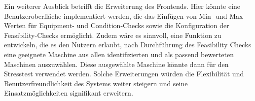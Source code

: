 Ein weiterer Ausblick betrifft die Erweiterung des Frontends. Hier könnte eine Benutzeroberfläche implementiert werden, die das Einfügen von Min- und Max-Werten für Equipment- und Condition-Checks sowie die Konfiguration der Feasibility-Checks ermöglicht. Zudem wäre es sinnvoll, eine Funktion zu entwickeln, die es den Nutzern erlaubt, nach Durchführung des Feasibility Checks eine geeignete Maschine aus allen identifizierten und als passend bewerteten Maschinen auszuwählen. Diese ausgewählte Maschine könnte dann für den Stresstest verwendet werden. Solche Erweiterungen würden die Flexibilität und Benutzerfreundlichkeit des Systems weiter steigern und seine Einsatzmöglichkeiten signifikant erweitern.
